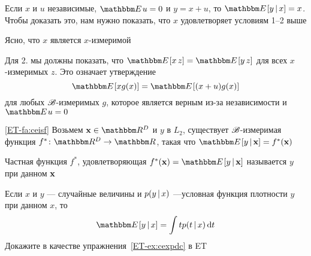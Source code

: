 \begin{frame}

    \vspace{2em}

    \Eg
        Если $x$ и $u$ независимые, $\EE u=0$  и $y = x + u$, то $\EE[y
        \given x] = x$. Чтобы доказать это, нам нужно показать, что $x$ удовлетворяет условиям
        1--2 выше
        
        Ясно, что $x$ является $x$-измеримой
        
        Для 2. мы должны показать, что $\EE[x \, z] = \EE[y\, z]$ для всех $x$-измеримых $z$. 
        Это означает утверждение
        \begin{equation*}
            \EE[ x g(x)] = \EE[ (x + u) g(x)]
        \end{equation*}
        для любых $\mathscr B$-измеримых $g$, которое является верным из-за независимости и $\EE u = 0$


\end{frame}

\begin{frame}

    \vspace{2em}
    \Fact\eqref{ET-fa:ceisf}
        Возьмем $\boldx \in \RR^D$ и $y$ в $L_2$, существует $\mathscr B$-измеримая
        функция $f^* \colon \RR^D \to \RR$, такая что $\EE[y \given \boldx] =
        f^*(\boldx)$
    
    Частная функция $f^*$, удовлетворяющая 
    $f^*(\boldx) = \EE[y \given \boldx]$ называется 
    $y$ при данном ${\mathbf x}$
    
    \vspace{1em}
    \Eg
    Если $x$ и $y$ --- случайные величины и $p(y \, | \, x)$ ---условная функция плотности $y$ при 
    данном $x$, то
    \begin{equation*}
        \EE[ y \given x] = \int t p(t \given x) \diff t
    \end{equation*}
    Докажите в качестве упражнения~\ref{ET-ex:cexpdc} в ET

\end{frame}

